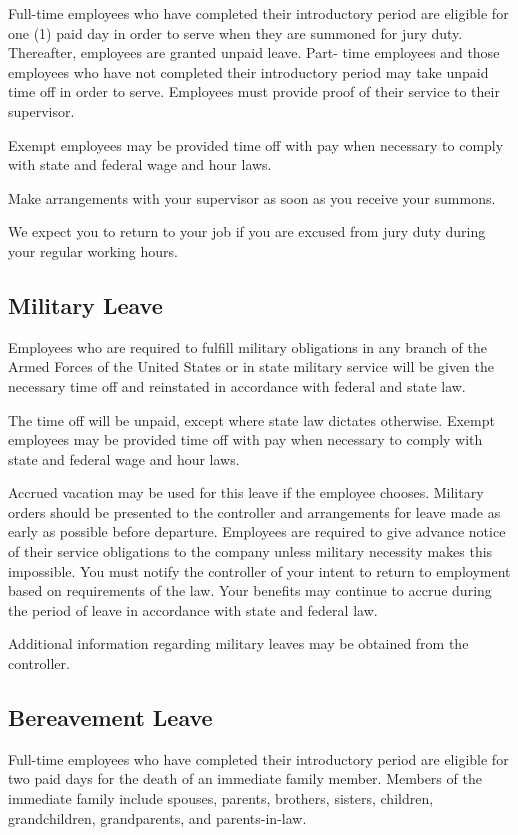 Full-time employees who have completed their introductory period are eligible for one (1) paid day in order to serve when they are summoned for jury duty. Thereafter, employees are granted unpaid leave. Part- time employees and those employees who have not completed their introductory period may take unpaid time off in order to serve. Employees must provide proof of their service to their supervisor.

Exempt employees may be provided time off with pay when necessary to comply with state and federal wage and hour laws.

Make arrangements with your supervisor as soon as you receive your summons.

We expect you to return to your job if you are excused from jury duty during your regular working hours.

\subsection{Military Leave}

Employees who are required to fulfill military obligations in any branch of the Armed Forces of the United States or in state military service will be given the necessary time off and reinstated in accordance with federal and state law.

The time off will be unpaid, except where state law dictates otherwise. Exempt employees may be provided time off with pay when necessary to comply with state and federal wage and hour laws.

Accrued vacation may be used for this leave if the employee chooses. Military orders should be presented to the controller and arrangements for leave made as early as possible before departure. Employees are required to give advance notice of their service obligations to the company unless military necessity makes this impossible. You must notify the controller of your intent to return to employment based on requirements of the law. Your benefits may continue to accrue during the period of leave in accordance with state and federal law.

Additional information regarding military leaves may be obtained from the controller.

\subsection{Bereavement Leave}

Full-time employees who have completed their introductory period are eligible for two paid days for the death of an immediate family member. Members of the immediate family include spouses, parents, brothers, sisters, children, grandchildren, grandparents, and parents-in-law.

